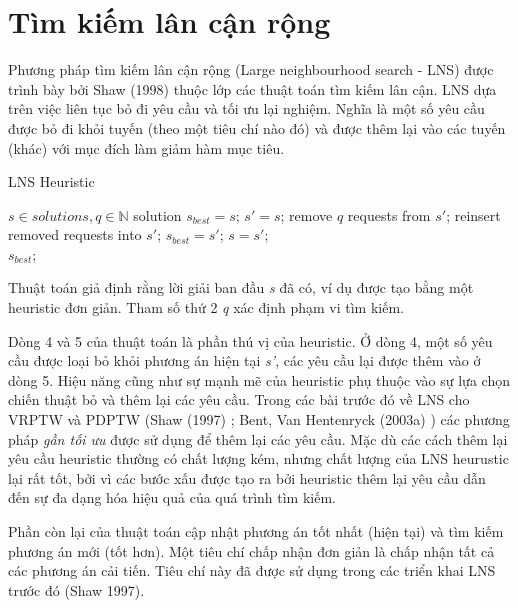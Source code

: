 \section{Tìm kiếm lân cận rộng}
Phương pháp tìm kiếm lân cận rộng (Large neighbourhood search - LNS) được trình bày bởi Shaw (1998) \cite{shaw1998using} thuộc lớp các thuật toán tìm kiếm lân cận. LNS dựa trên việc liên tục bỏ đi yêu cầu và tối ưu lại nghiệm. Nghĩa là một số yêu cầu được bỏ đi khỏi tuyến (theo một tiêu chí nào đó) và được thêm lại vào các tuyến (khác) với mục đích làm giảm hàm mục tiêu.

\begin{algorithm}
  \label{alg:lns}
	\caption{LNS Heuristic} 
	\begin{algorithmic}[1]
        \Require $s \in {solutions}, q \in \mathbb{N}$
        \State solution $s_{best} = s$;
				\Repeat
					\State $s'=s$;
					\State remove $q$ requests from $s'$;
					\State reinsert removed requests into $s'$;
						\State $s_{best} = s'$;
					\EndIf
						\State $s=s'$;
					\EndIf
				\\
				\Return $s_{best}$;
	\end{algorithmic} 
\end{algorithm}

Thuật toán giả định rằng lời giải ban đầu \textit{s} đã có, ví dụ được tạo bằng một heuristic đơn giản. Tham số thứ 2 \textit{q} xác định phạm vi tìm kiếm. 

Dòng 4 và 5 của thuật toán là phần thú vị của heuristic. Ở dòng 4, một số yêu cầu được loại bỏ khỏi phương án hiện tại \textit{s'}, các yêu cầu lại được thêm vào ở dòng 5. Hiệu năng cũng như sự mạnh mẽ của heuristic phụ thuộc vào sự lựa chọn chiến thuật bỏ và thêm lại các yêu cầu. Trong các bài trước đó về LNS cho VRPTW và PDPTW (Shaw (1997) \cite{}; Bent, Van Hentenryck (2003a) \cite{}) các phương pháp \textit{gần tối ưu} được sử dụng để thêm lại các yêu cầu. Mặc dù các cách thêm lại yêu cầu heuristic thường có chất lượng kém, nhưng chất lượng của LNS heurustic lại rất tốt, bởi vì các bước xấu được tạo ra bởi heuristic thêm lại yêu cầu dẫn đến sự đa dạng hóa hiệu quả của quá trình tìm kiếm. 

Phần còn lại của thuật toán cập nhật phương án tốt nhất (hiện tại) và tìm kiếm phương án mới (tốt hơn). Một tiêu chí chấp nhận đơn giản là chấp nhận tất cả các phương án cải tiến. Tiêu chí này đã được sử dụng trong các triển khai LNS trước đó (Shaw 1997).

